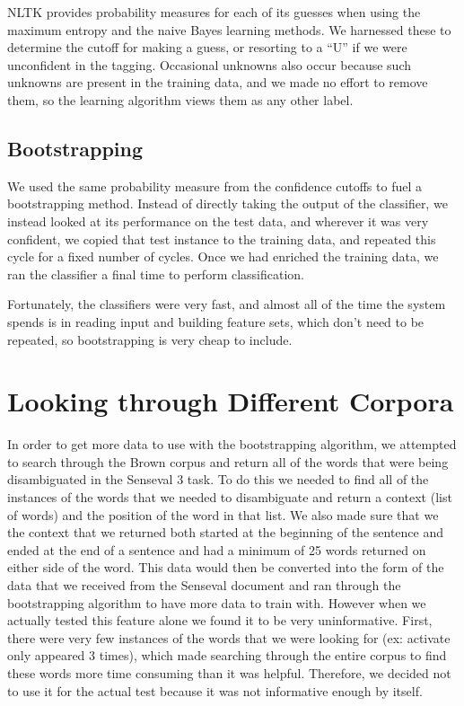 \documentclass{article}
\begin{document}
NLTK provides probability measures for each of its guesses when using the
maximum entropy and the naive Bayes learning methods.  We harnessed these to
determine the cutoff for making a guess, or resorting to a ``U'' if we were
unconfident in the tagging.  Occasional unknowns also occur because such
unknowns are present in the training data, and we made no effort to remove
them, so the learning algorithm views them as any other label.


\subsection{Bootstrapping}

We used the same probability measure from the confidence cutoffs to fuel a
bootstrapping method.  Instead of directly taking the output of the classifier,
we instead looked at its performance on the test data, and wherever it was very
confident, we copied that test instance to the training data, and repeated this
cycle for a fixed number of cycles.  Once we had enriched the training data, we
ran the classifier a final time to perform classification.

Fortunately, the classifiers were very fast, and almost all of the time the
system spends is in reading input and building feature sets, which don't need
to be repeated, so bootstrapping is very cheap to include.


\section{Looking through Different Corpora}

In order to get more data to use with the bootstrapping algorithm, we attempted
to search through the Brown corpus and return all of the words that were being
disambiguated in the Senseval 3 task.  To do this we needed to find all of the
instances of the words that we needed to disambiguate and return a context
(list of words) and the position of the word in that list.  We also made sure
that we the context that we returned both started at the beginning of the
sentence and ended at the end of a sentence and had a minimum of 25 words
returned on either side of the word.  This data would then be converted into
the form of the data that we received from the Senseval document and ran
through the bootstrapping algorithm to have more data to train with.  However
when we actually tested this feature alone we found it to be very
uninformative.  First, there were very few instances of the words that we were
looking for (ex: activate only appeared 3 times), which made searching through
the entire corpus to find these words more time consuming than it was helpful.
Therefore, we decided not to use it for the actual test because it was not
informative enough by itself.
\end{document}
